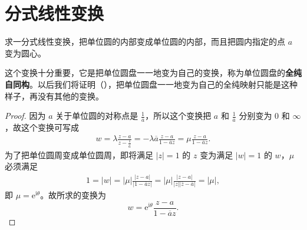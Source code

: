 \documentclass[../../main.tex]{subfiles}%
\begin{document}
\section{分式线性变换}\label{section:2.2.5}





\begin{example}\label{example:例2.5.16}
求一分式线性变换，把单位圆的内部变成单位圆的内部，而且把圆内指定的点 \( a \) 变为圆心。
\end{example}
\begin{remark}
这个变换十分重要，它是把单位圆盘一一地变为自己的变换，称为单位圆盘的\textbf{全纯自同构}。以后我们将证明（），把单位圆盘一一地变为自己的全纯映射只能是这种样子，再没有其他的变换。
\end{remark}
\begin{proof}

因为 \( a \) 关于单位圆的对称点是 \( \frac{1}{\overline{a}} \)，所以这个变换把 \( a \) 和 \( \frac{1}{\overline{a}} \) 分别变为 \( 0 \) 和 \( \infty \)，故这个变换可写成
\[
\begin{aligned}
w = \lambda \frac{z - a}{z - \frac{1}{\overline{a}}} = -\lambda \overline{a} \frac{z - a}{1 - \overline{a} z} = \mu \frac{z - a}{1 - \overline{a} z}.
\end{aligned}
\]
为了把单位圆周变成单位圆周，即将满足 \( |z| = 1 \) 的 \( z \) 变为满足 \( |w| = 1 \) 的 \( w \)，\( \mu \) 必须满足
\[
\begin{aligned}
1 = |w| = |\mu| \frac{|z - a|}{|1 - \overline{a} z|} = |\mu| \frac{|z - a|}{|z| |\overline{z} - \overline{a}|} = |\mu|,
\end{aligned}
\]
即 \( \mu = \mathrm{e}^{\mathrm{i}\theta} \)。故所求的变换为
\[
w = \mathrm{e}^{\mathrm{i}\theta} \frac{z - a}{1 - \overline{a} z}.
\] 

\end{proof}
\end{document}
